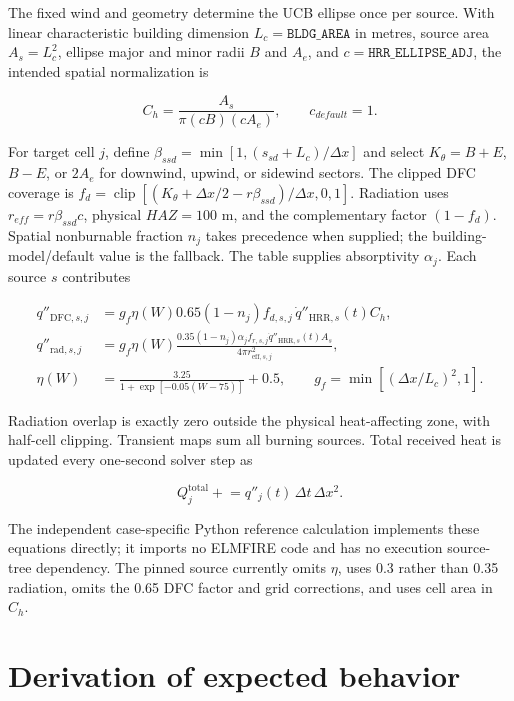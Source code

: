 The fixed wind and geometry determine the UCB ellipse once per source. With
linear characteristic building dimension $L_c=\texttt{BLDG\_AREA}$ in metres,
source area $A_s=L_c^2$, ellipse major and minor radii $B$ and $A_e$, and
$c=\texttt{HRR\_ELLIPSE\_ADJ}$, the intended spatial normalization is

\begin{equation}
 C_h=\frac{A_s}{\pi(cB)(cA_e)},\qquad c_{default}=1.
\end{equation}

For target cell $j$, define
$\beta_{ssd}=\min[1,(s_{sd}+L_c)/\Delta x]$ and select
$K_\theta=B+E$, $B-E$, or $2A_e$ for downwind, upwind, or sidewind sectors.
The clipped DFC coverage is
$f_d=\operatorname{clip}[(K_\theta+\Delta x/2-r\beta_{ssd})/\Delta x,0,1]$.
Radiation uses $r_{eff}=r\beta_{ssd}c$, physical $HAZ=100$ m, and the
complementary factor $(1-f_d)$. Spatial nonburnable fraction $n_j$ takes
precedence when supplied; the building-model/default value is the fallback.
The table supplies absorptivity $\alpha_j$. Each source $s$ contributes

\begin{align}
 q''_{\mathrm{DFC},s,j} &= g_f\eta(W)0.65(1-n_j)f_{d,s,j}\,\dot q''_{\mathrm{HRR},s}(t)C_h,\\
 q''_{\mathrm{rad},s,j} &= g_f\eta(W)\frac{0.35(1-n_j)\alpha_j f_{r,s,j}
                 \dot q''_{\mathrm{HRR},s}(t)A_s}{4\pi r_{\mathrm{eff},s,j}^2},\\
 \eta(W)&=\frac{3.25}{1+\exp[-0.05(W-75)]}+0.5,\qquad
 g_f=\min[(\Delta x/L_c)^2,1].
\end{align}

Radiation overlap is exactly zero outside the physical heat-affecting zone,
with half-cell clipping. Transient maps sum all burning
sources.  Total received heat is updated every one-second solver step as

\begin{equation}
 Q^{\mathrm{total}}_j \mathrel{+}=q''_j(t)\,\Delta t\,\Delta x^2.
\end{equation}

The independent case-specific Python reference calculation implements these equations directly;
it imports no ELMFIRE code and has no execution source-tree dependency. The
pinned source currently omits $\eta$, uses 0.3 rather than 0.35 radiation,
omits the 0.65 DFC factor and grid corrections, and uses cell area in $C_h$.

\section{Derivation of expected behavior}

